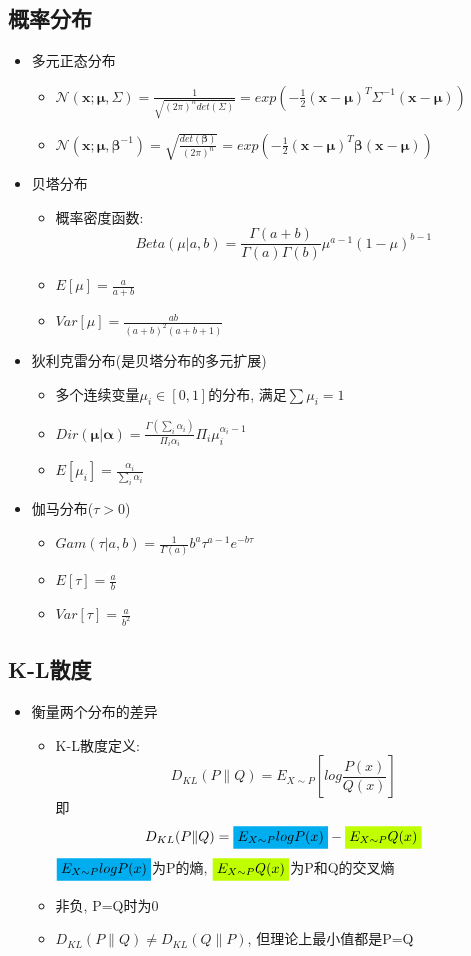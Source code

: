 \documentclass[UTF8]{article}
\newcommand{\colorboxm}[2]{\text{\colorbox{#1}{$#2$}}}
\begin{document}
\subsection{概率分布}
\begin{itemize}
\item 多元正态分布
	\begin{itemize}
	\item $\mathcal{N}(\bm{x}; \bm{\mu},\Sigma)=\frac{1}{\sqrt{(2\pi)^ndet(\Sigma)}}=exp\left(-\frac{1}{2}(\bm{x}-\bm{\mu})^T\Sigma^{-1}(\bm{x}-\bm{\mu})\right)$
	\item $\mathcal{N}(\bm{x}; \bm{\mu},\bm{\beta}^{-1})=\sqrt{\frac{det(\bm{\beta})}{(2\pi)^n}}=exp\left(-\frac{1}{2}(\bm{x}-\bm{\mu})^T\bm{\beta}(\bm{x}-\bm{\mu})\right)$
	\end{itemize}
\item 贝塔分布
	\begin{itemize}
	\item 概率密度函数: $$Beta(\mu|a,b)=\frac{\Gamma(a+b)}{\Gamma(a)\Gamma(b)}\mu^{a-1}(1-\mu)^{b-1}$$
	\item $E[\mu]=\frac{a}{a+b}$
	\item $Var[\mu]=\frac{ab}{(a+b)^2(a+b+1)}$
	\end{itemize}
\item 狄利克雷分布(是贝塔分布的多元扩展)
	\begin{itemize}
	\item 多个连续变量$\mu_i\in[0,1]$的分布, 满足$\sum\mu_i=1$
	\item $Dir(\bm{\mu}|\bm{\alpha})=\frac{\Gamma(\sum_i\alpha_i)}{\Pi_i\alpha_i}\Pi_i\mu_i^{\alpha_i-1}$
	\item $E[\mu_i]=\frac{\alpha_i}{\sum_i\alpha_i}$
	\end{itemize}
\item 伽马分布($\tau>0$)
	\begin{itemize}
	\item $Gam(\tau|a,b)=\frac{1}{\Gamma(a)}b^a\tau^{a-1}e^{-b\tau}$
	\item $E[\tau]=\frac{a}{b}$
	\item $Var[\tau]=\frac{a}{b^2}$
	\end{itemize}
\end{itemize}

\subsection{K-L散度}
\begin{itemize}
\item 衡量两个分布的差异
	\begin{itemize}
	\item K-L散度定义: $$D_{KL}(P\|Q)=E_{X\sim P}\left[log\frac{P(x)}{Q(x)}\right]$$
	即$$D_{KL}(P\|Q)=\colorboxm{cyan}{E_{X\sim P}logP(x)} - \colorboxm{lime}{E_{X\sim P}{Q(x)}}$$
	$\colorboxm{cyan}{E_{X\sim P}logP(x)}$为P的熵, $\colorboxm{lime}{E_{X\sim P}{Q(x)}}$为P和Q的交叉熵
	\item 非负, P=Q时为0
	\item $D_{KL}(P\|Q)\not=D_{KL}(Q\|P)$, 但理论上最小值都是P=Q
	\end{itemize}
\end{itemize}
\end{document}
